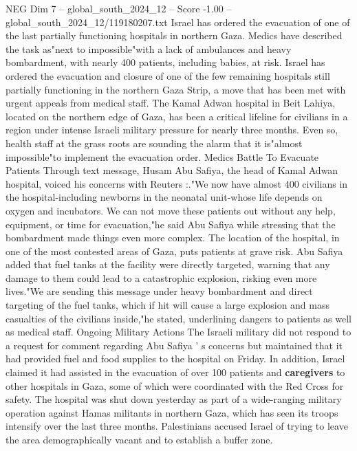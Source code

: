 \begin{textsample}{NEG Dim 7 – global\_south\_2024\_12 – Score -1.00 – global\_south\_2024\_12/119180207.txt}  \label{ex:f7_neg_101}
Israel has ordered the evacuation of one of the last partially functioning hospitals in northern Gaza.
Medics have described the task as"next to impossible"with a lack of ambulances and heavy bombardment, with nearly 400 patients, including babies, at risk.
Israel has ordered the evacuation and closure of one of the few remaining hospitals still partially functioning in the northern Gaza Strip, a move that has been met with urgent appeals from medical staff.
The Kamal Adwan hospital in Beit Lahiya, located on the northern edge of Gaza, has been a critical lifeline for civilians in a region under intense Israeli military pressure for nearly three months.
Even so, health staff at the grass roots are sounding the alarm that it is"almost impossible"to implement the evacuation order.
Medics Battle To Evacuate Patients Through text message, Husam Abu Safiya, the head of Kamal Adwan hospital, voiced his concerns with Reuters :."We now have almost 400 civilians in the hospital-including newborns in the neonatal unit-whose life depends on oxygen and incubators.
We can not move these patients out without any help, equipment, or time for evacuation,"he said Abu Safiya while stressing that the bombardment made things even more complex.
The location of the hospital, in one of the most contested areas of Gaza, puts patients at grave risk.
Abu Safiya added that fuel tanks at the facility were directly targeted, warning that any damage to them could lead to a catastrophic explosion, risking even more lives."We are sending this message under heavy bombardment and direct targeting of the fuel tanks, which if hit will cause a large explosion and mass casualties of the civilians inside,"he stated, underlining dangers to patients as well as medical staff.
Ongoing Military Actions The Israeli military did not respond to a request for comment regarding Abu Safiya ' s concerns but maintained that it had provided fuel and food supplies to the hospital on Friday.
In addition, Israel claimed it had assisted in the evacuation of over 100 patients and \textbf{caregivers} to other hospitals in Gaza, some of which were coordinated with the Red Cross for safety.
The hospital was shut down yesterday as part of a wide-ranging military operation against Hamas militants in northern Gaza, which has seen its troops intensify over the last three months.
Palestinians accused Israel of trying to leave the area demographically vacant and to establish a buffer zone.

\end{textsample}
